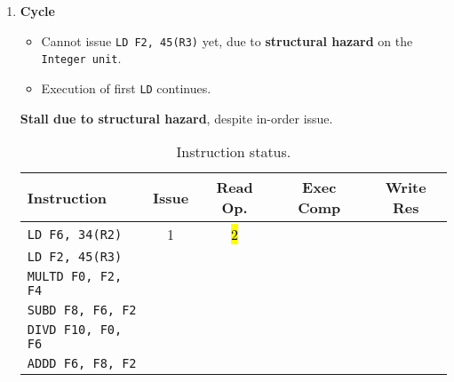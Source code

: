 \begin{enumerate}
    \newpage


    \item \textbf{Cycle \theenumi}
    \begin{itemize}
        \item[\textcolor{Red2}{\faIcon{exclamation-triangle}}] Cannot issue \texttt{LD F2, 45(R3)} yet, due to \textbf{structural hazard} on the \texttt{Integer unit}.
        \item Execution of first \texttt{LD} continues.
    \end{itemize}
    \textbf{Stall due to structural hazard}, despite in-order issue.

    \begin{table}[!htp]
        \centering
        \begin{tabular}{@{} l | c c c c @{}}
            \toprule
            Instruction                 & Issue & Read Op.  & Exec Comp & Write Res \\
            \midrule
            \texttt{LD    F6, 34(R2)}   & 1     & \hl{2}    &           &           \\ [.3em]
            \texttt{LD    F2, 45(R3)}   &       &           &           &           \\ [.3em]
            \texttt{MULTD F0, F2, F4}   &       &           &           &           \\ [.3em]
            \texttt{SUBD  F8, F6, F2}   &       &           &           &           \\ [.3em]
            \texttt{DIVD  F10, F0, F6}  &       &           &           &           \\ [.3em]
            \texttt{ADDD  F6, F8, F2}   &       &           &           &           \\
            \bottomrule
        \end{tabular}
        \caption*{Instruction status.}
    \end{table}


\end{enumerate}
